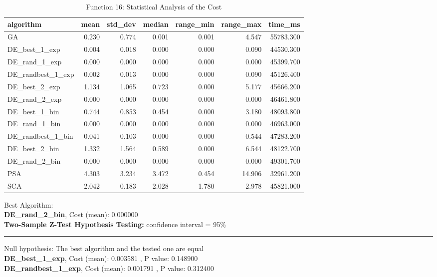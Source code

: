\documentclass[12pt]{article}
\begin{document}
\begin{table}[H]
    \centering
    \footnotesize
\begin{tabular}{lrrrrrr}
\toprule
         algorithm &  mean &  std\_dev &  median &  range\_min &  range\_max &   time\_ms \\
\midrule
                GA & 0.230 &    0.774 &   0.001 &      0.001 &      4.547 & 55783.300 \\
     DE\_best\_1\_exp & 0.004 &    0.018 &   0.000 &      0.000 &      0.090 & 44530.300 \\
     DE\_rand\_1\_exp & 0.000 &    0.000 &   0.000 &      0.000 &      0.000 & 45399.700 \\
 DE\_randbest\_1\_exp & 0.002 &    0.013 &   0.000 &      0.000 &      0.090 & 45126.400 \\
     DE\_best\_2\_exp & 1.134 &    1.065 &   0.723 &      0.000 &      5.177 & 45666.200 \\
     DE\_rand\_2\_exp & 0.000 &    0.000 &   0.000 &      0.000 &      0.000 & 46461.800 \\
     DE\_best\_1\_bin & 0.744 &    0.853 &   0.454 &      0.000 &      3.180 & 48093.800 \\
     DE\_rand\_1\_bin & 0.000 &    0.000 &   0.000 &      0.000 &      0.000 & 46963.000 \\
 DE\_randbest\_1\_bin & 0.041 &    0.103 &   0.000 &      0.000 &      0.544 & 47283.200 \\
     DE\_best\_2\_bin & 1.332 &    1.564 &   0.589 &      0.000 &      6.544 & 48122.700 \\
     DE\_rand\_2\_bin & 0.000 &    0.000 &   0.000 &      0.000 &      0.000 & 49301.700 \\
               PSA & 4.303 &    3.234 &   3.472 &      0.454 &     14.906 & 32961.200 \\
               SCA & 2.042 &    0.183 &   2.028 &      1.780 &      2.978 & 45821.000 \\
\bottomrule
\end{tabular}

\caption{Function 16: Statistical Analysis of the Cost} 
    \end{table}
Best Algorithm: \\
\textbf{DE\_rand\_2\_bin}, Cost (mean): 0.000000\\
\noindent
\textbf{Two-Sample Z-Test Hypothesis Testing: }
confidence interval = 95\%\\
\vspace{-3mm}
\rule[3mm]{\linewidth}{0.2pt}
Null hypothesis: The best algorithm and the tested one are equal\\
\textbf{DE\_best\_1\_exp}, Cost (mean): 0.003581
, P value: 0.148900\\
\textbf{DE\_randbest\_1\_exp}, Cost (mean): 0.001791
, P value: 0.312400\\
\newpage
\end{document}
